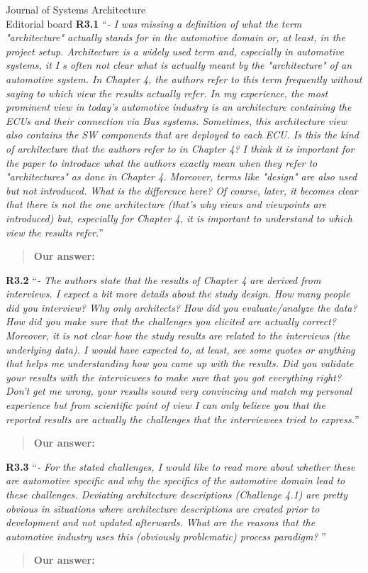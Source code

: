 \documentclass[a4paper,10pt]{letter}
\begin{document}
\begin{letter}{Journal of Systems Architecture\\
    Editorial board}
\textbf{R3.1} ``\textit{- I was missing a definition of what the term "architecture" actually stands for in the automotive domain or, at least, in the project setup. Architecture is a widely used term and, especially in automotive systems, it I s often not clear what is actually meant by the "architecture" of an automotive system. In Chapter 4, the authors refer to this term frequently without saying to which view the results actually refer. In my experience, the most prominent view in today's automotive industry is an architecture containing the ECUs and their connection via Bus systems. Sometimes, this architecture view also contains the SW components that are deployed to each ECU. Is this the kind of architecture that the authors refer to in Chapter 4? I think it is important for the paper to introduce what the authors exactly mean when they refer to "architectures" as done in Chapter 4. Moreover, terms like "design" are also used but not introduced. What is the difference here? Of course,
later, it becomes clear that there is not the one architecture (that's why views and viewpoints are introduced) but, especially for Chapter 4, it is important to understand to which view the results refer.}''
\begin{quote}
\textbf{Our answer: }
\end{quote}

\textbf{R3.2} ``\textit{- The authors state that the results of Chapter 4 are derived from interviews. I expect a bit more details about the study design. How many people did you interview? Why only architects? How did you evaluate/analyze the data? How did you make sure that the challenges you elicited are actually correct? Moreover, it is not clear how the study results are related to the interviews (the underlying data). I would have expected to, at least, see some quotes or anything that helps me understanding how you came up with the results. Did you validate your results with the interviewees to make sure that you got everything right? Don't get me wrong, your results sound very convincing and match my personal experience but from scientific point of view I can only believe you that the reported results are actually the challenges that the interviewees tried to express.}''
\begin{quote}
\textbf{Our answer: }
\end{quote}

\textbf{R3.3} ``\textit{- For the stated challenges, I would like to read more about whether these are automotive specific and why the specifics of the automotive domain lead to these challenges. Deviating architecture descriptions (Challenge 4.1) are pretty obvious in situations where architecture descriptions are created prior to development and not updated afterwards. What are the reasons that the automotive industry uses this (obviously problematic) process paradigm? }''
\begin{quote}
\textbf{Our answer: }
\end{quote}


\end{letter}
\end{document}
